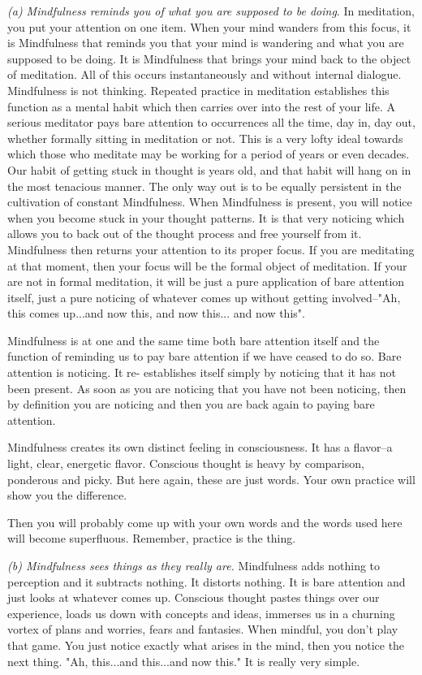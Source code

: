\emph{(a) Mindfulness reminds you of what you are supposed to be doing}. In
meditation, you put your attention on one item. When your mind wanders from this
focus, it is Mindfulness that reminds you that your mind is wandering and what
you are supposed to be doing. It is Mindfulness that brings your mind back to
the object of meditation. All of this occurs instantaneously and without
internal dialogue. Mindfulness is not thinking. Repeated practice in meditation
establishes this function as a mental habit which then carries over into the
rest of your life. A serious meditator pays bare attention to occurrences all
the time, day in, day out, whether formally sitting in meditation or not. This
is a very lofty ideal towards which those who meditate may be working for a
period of years or even decades. Our habit of getting stuck in thought is years
old, and that habit will hang on in the most tenacious manner. The only way out
is to be equally persistent in the cultivation of constant Mindfulness. When
Mindfulness is present, you will notice when you become stuck in your thought
patterns. It is that very noticing which allows you to back out of the thought
process and free yourself from it. Mindfulness then returns your attention to
its proper focus. If you are meditating at that moment, then your focus will be
the formal object of meditation. If your are not in formal meditation, it will
be just a pure application of bare attention itself, just a pure noticing of
whatever comes up without getting involved--"Ah, this comes up...and now this,
and now this... and now this".

Mindfulness is at one and the same time both bare attention itself and the
function of reminding us to pay bare attention if we have ceased to do so. Bare
attention is noticing. It re- establishes itself simply by noticing that it has
not been present. As soon as you are noticing that you have not been noticing,
then by definition you are noticing and then you are back again to paying bare
attention.

Mindfulness creates its own distinct feeling in consciousness. It has a
flavor--a light, clear, energetic flavor. Conscious thought is heavy by
comparison, ponderous and picky. But here again, these are just words. Your own
practice will show you the difference.

Then you will probably come up with your own words and the words used here will
become superfluous. Remember, practice is the thing.

\emph{(b) Mindfulness sees things as they really are.} Mindfulness adds nothing to
perception and it subtracts nothing. It distorts nothing. It is bare attention and just looks at whatever comes up. Conscious
thought pastes things over our experience, loads us down with concepts and
ideas, immerses us in a churning vortex of plans and worries, fears and
fantasies. When mindful, you don't play that game. You just notice exactly what
arises in the mind, then you notice the next thing. "Ah, this...and this...and
now this." It is really very simple.


